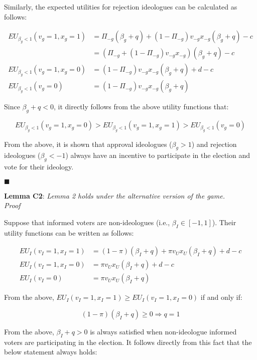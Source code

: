 \par Similarly, the expected utilities for rejection ideologues can be calculated as follows:

\begin{align*}
	EU_{\beta_g<1} (v_g=1, x_g=1) &= \Pi_{-g} (\beta_g + q) + (1-\Pi_{-g}) v_{-g} x_{-g} (\beta_g+q) - c \\
	&= (\Pi_{-g} + (1-\Pi_{-g})v_{-g} x_{-g}) (\beta_g+q) - c \\
	EU_{\beta_g<1} (v_g=1, x_g=0) &= (1-\Pi_{-g}) v_{-g} x_{-g} (\beta_g+q) + d - c \\
	EU_{\beta_g<1}(v_g=0) &= (1-\Pi_{-g})v_{-g} x_{-g} (\beta_g+q)
\end{align*}

\noindent Since $\beta_g+q<0$, it directly follows from the above utility functions that:

$$EU_{\beta_g<1} (v_g=1, x_g=0) > EU_{\beta_g<1} (v_g=1, x_g=1) > EU_{\beta_g<1}(v_g=0)$$

\par From the above, it is shown that approval ideologues ($\beta_g>1$) and rejection ideologues ($\beta_g<-1$) always have an incentive to participate in the election and vote for their ideology. 

\hfill $\blacksquare$

\noindent \textbf{Lemma C2}: \textit{Lemma 2 holds under the alternative version of the game.}\\

\noindent \textit{Proof}

\par Suppose that informed voters are non-ideologues (i.e., $\beta_I \in [-1,1]$). Their utility functions can be written as follows:

\begin{align*}
	EU_I (v_I=1,x_I=1) &= (1-\pi) (\beta_I + q) + \pi v_U x_U (\beta_I + q) + d - c \\
	EU_I (v_I=1, x_I=0) &= \pi v_U x_U (\beta_I + q) + d - c \\
	EU_I (v_I=0) &= \pi v_U x_U (\beta_I + q)
\end{align*}

\noindent From the above, $EU_I (v_I=1,x_I=1) \geq EU_I (v_I=1, x_I=0)$ if and only if: 

$$(1-\pi) (\beta_I + q) \geq 0 \Rightarrow q = 1$$ 

\par From the above, $\beta_I + q > 0$ is always satisfied when non-ideologue informed voters are participating in the election. It follows directly from this fact that the below statement always holds:

